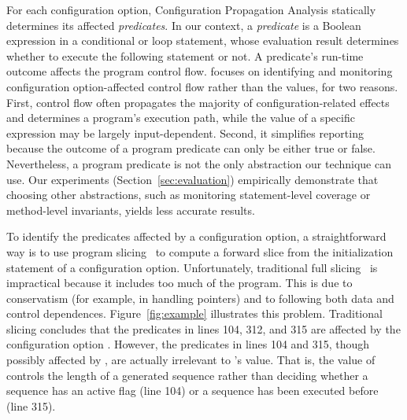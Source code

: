 For each configuration option, Configuration Propagation Analysis statically determines
its affected \textit{predicates}. In our context, a \textit{predicate}
is a Boolean expression in a conditional or loop statement, whose evaluation result
determines whether to execute the following statement or not.
A predicate's run-time outcome affects the program control flow.
\ourtool focuses on identifying and monitoring 
configuration option-affected control flow
rather than the values, for two reasons. First, control flow 
often propagates the majority of configuration-related effects
and determines a program's execution path, while
the value of a specific expression may be largely input-dependent.
Second, it simplifies reporting because the outcome of a program predicate can only be
either true or false.  Nevertheless, a program predicate is not the only
abstraction our technique can use. 
Our experiments (Section~\ref{sec:evaluation})
empirically demonstrate that choosing other abstractions,
such as monitoring statement-level coverage
or method-level invariants, yields less accurate results.


To identify the predicates affected by a configuration option, a straightforward
way is to use program slicing~\cite{Horwitz:1988} to compute
a forward slice from the initialization statement of a
configuration option. Unfortunately, traditional full slicing~\cite{Horwitz:1988}
is impractical
because it includes too much of the program.  This is due to conservatism
(for example, in handling pointers) and to following both data and control
dependences.
Figure~\ref{fig:example} illustrates
this problem.  Traditional slicing concludes that the predicates
in lines 104, 312, and 315 are affected by the configuration option .
However, the predicates in lines 104 and 315, though possibly
affected by , are actually irrelevant
to 's value. That is, the value of 
controls the length of a generated sequence rather
than deciding whether a sequence has an active flag (line 104) or
a sequence has been executed before (line 315).

